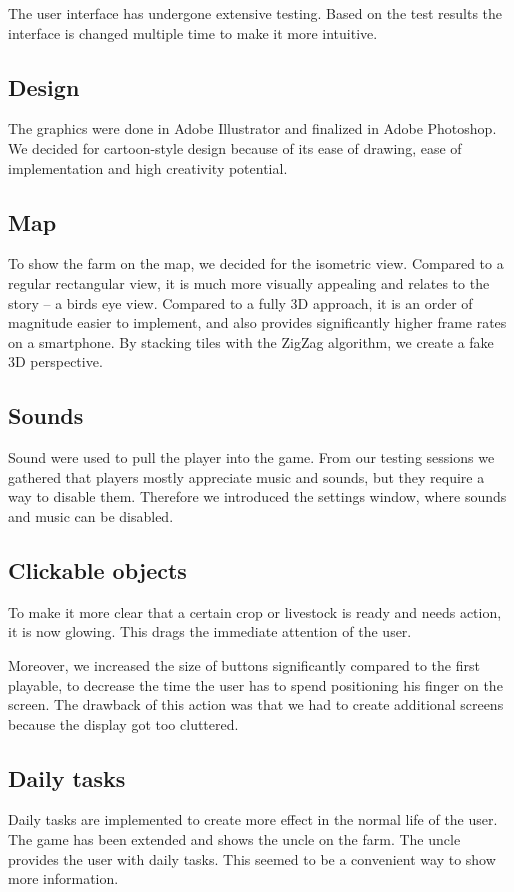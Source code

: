 The user interface has undergone extensive testing. Based on the test results the interface is changed multiple time to make it more intuitive. 

\subsection{Design}
The graphics were done in Adobe Illustrator and finalized in Adobe Photoshop. We decided for cartoon-style design because of its ease of drawing, ease of implementation and high creativity potential.

\subsection{Map}
To show the farm on the map, we decided for the isometric view. Compared to a regular rectangular view, it is much more visually appealing and relates to the story -- a birds eye view. Compared to a fully 3D approach, it is an order of magnitude easier to implement, and also provides significantly higher frame rates on a smartphone. By stacking tiles with the ZigZag algorithm, we create a fake 3D perspective.

\subsection{Sounds}
Sound were used to pull the player into the game. From our testing sessions we gathered that players mostly appreciate music and sounds, but they require a way to disable them. Therefore we introduced the settings window, where sounds and music can be disabled.

\subsection{Clickable objects}

To make it more clear that a certain crop or livestock is ready and needs action, it is now glowing. This drags the immediate attention of the user.

Moreover, we increased the size of buttons significantly compared to the first playable, to decrease the time the user has to spend positioning his finger on the screen. The drawback of this action was that we had to create additional screens because the display got too cluttered.

\subsection{Daily tasks}
Daily tasks are implemented to create more effect in the normal life of the user. The game has been extended and shows the uncle on the farm. The uncle provides the user with daily tasks. This seemed to be a convenient way to show more information.

